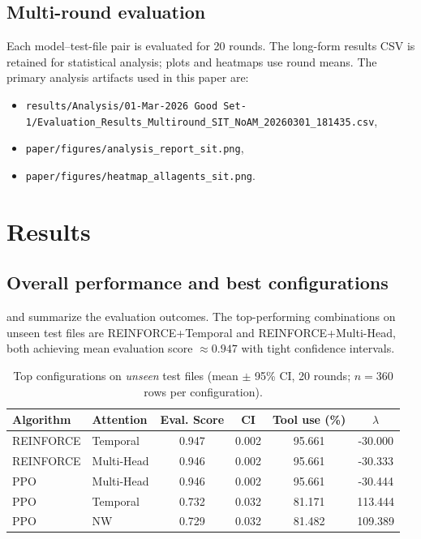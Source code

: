 \documentclass[11pt]{article}
\begin{document}
\subsection{Multi-round evaluation}
Each model--test-file pair is evaluated for 20 rounds. The long-form results CSV is retained for statistical analysis; plots and heatmaps use round means. The primary analysis artifacts used in this paper are:
\begin{itemize}
  \item \texttt{results/Analysis/01-Mar-2026 Good Set-1/Evaluation\_Results\_Multiround\_SIT\_NoAM\_20260301\_181435.csv},
  \item \texttt{paper/figures/analysis\_report\_sit.png},
  \item \texttt{paper/figures/heatmap\_allagents\_sit.png}.
\end{itemize}

\section{Results}
\subsection{Overall performance and best configurations}
 and  summarize the evaluation outcomes. The top-performing combinations on unseen test files are \textsc{REINFORCE}+Temporal and \textsc{REINFORCE}+Multi-Head, both achieving mean evaluation score $\approx 0.947$ with tight confidence intervals.

\begin{table}[t]
\centering
\caption{Top configurations on \emph{unseen} test files (mean $\pm$ 95\% CI, 20 rounds; $n=360$ rows per configuration).}
\label{tab:top}
\begin{tabular}{ll S[table-format=1.3] S[table-format=1.3] S[table-format=2.3] S[table-format=3.3]}
\toprule
\textbf{Algorithm} & \textbf{Attention} & {\textbf{Eval. Score}} & {\textbf{CI}} & {\textbf{Tool use (\%)}} & {\textbf{$\lambda$}} \\
\midrule
REINFORCE & Temporal   & 0.947 & 0.002 & 95.661 & -30.000 \\
REINFORCE & Multi-Head & 0.946 & 0.002 & 95.661 & -30.333 \\
PPO       & Multi-Head & 0.946 & 0.002 & 95.661 & -30.444 \\
PPO       & Temporal   & 0.732 & 0.032 & 81.171 & 113.444 \\
PPO       & NW         & 0.729 & 0.032 & 81.482 & 109.389 \\
\bottomrule
\end{tabular}
\end{table}
\end{document}

